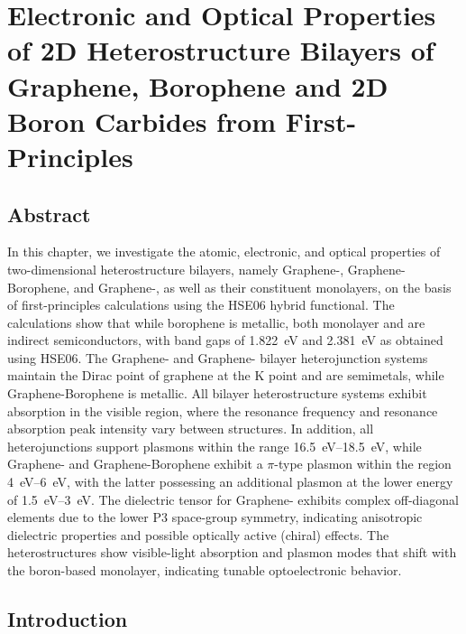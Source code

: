 \chapter[Optoelectronic Properties of Heterostructure Bilayers]{Electronic and Optical Properties of 2D Heterostructure Bilayers of Graphene, Borophene and 2D Boron Carbides from First-Principles}
\label{cha:project_bilayers}

\section{Abstract}
\label{1_abstract}

In this chapter,
we investigate the atomic, electronic, and optical properties of two-dimensional heterostructure bilayers,
namely Graphene-, Graphene-Borophene, and Graphene-,
as well as their constituent monolayers, on the basis of first-principles calculations using the HSE06 hybrid functional.
The calculations show that while borophene is metallic,
both monolayer  and  are indirect semiconductors,
with band gaps of \qty{1.822}{\electronvolt} and \qty{2.381}{\electronvolt} as obtained using HSE06.
The Graphene- and Graphene- bilayer heterojunction systems maintain the Dirac point of graphene at the $\mathrm{K}$ point and are semimetals,
while Graphene-Borophene is metallic.
All bilayer heterostructure systems exhibit absorption in the visible region, where the resonance frequency and resonance absorption peak intensity vary between structures.
In addition, all heterojunctions support plasmons within the range \qtyrange{16.5}{18.5}{\electronvolt}, while Graphene- and Graphene-Borophene exhibit a $\pi$-type plasmon within the region \qtyrange{4}{6}{\electronvolt},
with the latter possessing an additional plasmon at the lower energy of \qtyrange{1.5}{3}{\electronvolt}.
The dielectric tensor for Graphene- exhibits complex off-diagonal elements due to the lower $\mathrm{P}3$ space-group symmetry, indicating anisotropic dielectric properties and possible optically active (chiral) effects.
The heterostructures show visible-light absorption and plasmon modes that shift with the boron-based monolayer, indicating tunable optoelectronic behavior.

\clearpage
\section{Introduction}
\label{1_introduction}

